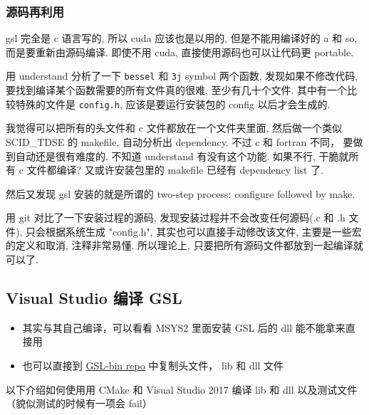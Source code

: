 \subsubsection{源码再利用}
gsl 完全是 c 语言写的, 所以 cuda 应该也是以用的, 但是不能用编译好的 a 和 so, 而是要重新由源码编译. 即使不用 cuda, 直接使用源码也可以让代码更 portable.

用 understand 分析了一下 \verb`bessel` 和 \verb`3j` symbol 两个函数, 发现如果不修改代码, 要找到编译某个函数需要的所有文件真的很难, 至少有几十个文件. 其中有一个比较特殊的文件是 \verb`config.h`, 应该是要运行安装包的 config 以后才会生成的.

我觉得可以把所有的头文件和 c 文件都放在一个文件夹里面, 然后做一个类似 SCID_TDSE 的 makefile, 自动分析出 dependency. 不过 c 和 fortran 不同， 要做到自动还是很有难度的. 不知道 understand 有没有这个功能. 如果不行, 干脆就所有 c 文件都编译? 又或许安装包里的 makefile 已经有 dependency list 了.

然后又发现 gsl 安装的就是所谓的 two-step process: configure followed by make.

用 git 对比了一下安装过程的源码, 发现安装过程并不会改变任何源码(.c 和 .h 文件), 只会根据系统生成 "config.h", 其实也可以直接手动修改该文件, 主要是一些宏的定义和取消, 注释非常易懂. 所以理论上, 只要把所有源码文件都放到一起编译就可以了.


\subsection{Visual Studio 编译 GSL}
\begin{itemize}
\item 其实与其自己编译，可以看看 MSYS2 里面安装 GSL 后的 dll 能不能拿来直接用
\item 也可以直接到 \href{https://github.com/MacroUniverse/GSL-bin}{GSL-bin repo} 中复制头文件， lib 和 dll 文件
\end{itemize}

以下介绍如何使用用 CMake 和 Visual Studio 2017 编译 lib 和 dll 以及测试文件（貌似测试的时候有一项会 fail）

